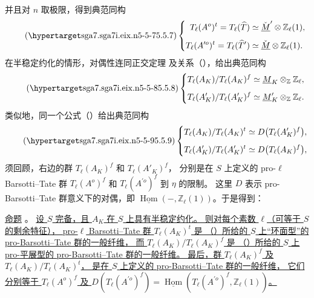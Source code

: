 并且对 $n$ 取极限，得到典范同构
\begin{equation}\tag{\SGARefTarget{sga7.sga7i.eix.n5-5-7}{5.5.7}}
 \left\{
 \begin{aligned}
  T_\ell(A^o)^t=T_\ell(\widehat T)
   &\simeq \check{\underline M}'\otimes\mathbb Z_\ell(1),\\[1ex]
  T_\ell(A^{\prime o})^t=T_\ell(\widehat T')
   &\simeq \check{\underline M}\otimes\mathbb Z_\ell(1).
 \end{aligned}
 \right.
\end{equation}
在半稳定约化的情形，对偶性连同正交定理 
及关系（），给出典范同构
\begin{equation}\tag{\SGARefTarget{sga7.sga7i.eix.n5-5-8}{5.5.8}}
 \left\{
 \begin{aligned}
  T_\ell(A_K)/T_\ell(A_K)^f
   &\simeq \underline M_K\otimes_{\mathbb Z}\mathbb Z_\ell,\\[1ex]
  T_\ell(A'_K)/T_\ell(A'_K)^f
   &\simeq \underline M'_K\otimes_{\mathbb Z}\mathbb Z_\ell.
 \end{aligned}
 \right.
\end{equation}
类似地，同一个公式（）给出典范同构
\begin{equation}\tag{\SGARefTarget{sga7.sga7i.eix.n5-5-9}{5.5.9}}
 \left\{
 \begin{aligned}
  T_\ell(A_K)/T_\ell(A_K)^t
   &\simeq D\bigl(T_\ell(A'_K)^f\bigr),\\[1ex]
  T_\ell(A'_K)/T_\ell(A'_K)^t
   &\simeq D\bigl(T_\ell(A_K)^f\bigr),
 \end{aligned}
 \right.
\end{equation}
须回顾，右边的群 $T_\ell(A_K)^f$ 和 $T_\ell(A'_K)^f$，
分别是在 $S$ 上定义的 pro-$\ell$ Barsotti--Tate 群 $T_\ell(A^o)^f$ 和
$T_\ell(A^{\prime o})^f$ 到 $\eta$ 的限制。
这里 $D$ 表示 pro-Barsotti--Tate 群意义下的对偶，即
$\underline{\operatorname{Hom}}(-,\mathbb Z_\ell(1))$。于是得到：

\medskip
\noindent
\underline{命题} 。
\underline{设 $S$ 完备，且 $A_K$ 在 $S$ 上具有半稳定约化。
则对每个素数 $\ell$（可等于 $S$ 的剩余特征），
pro-$\ell$ Barsotti--Tate 群 $T_\ell(A_K)^t$ 是
（）所给的 $S$ 上“环面型”的 pro-Barsotti--Tate 群的一般纤维，
而 $T_\ell(A_K)/T_\ell(A_K)^f$ 是
（）所给的 $S$ 上 pro-平展型的 pro-Barsotti--Tate 群的一般纤维。
最后，群 $T_\ell(A_K)^f$ 及 $T_\ell(A_K)/T_\ell(A_K)^t$，
是在 $S$ 上定义的 pro-Barsotti--Tate 群的一般纤维，
它们分别等于 $T_\ell(A^o)^f$ 及
$D(T_\ell(A^{\prime o})^f)=\underline{\operatorname{Hom}}(T_\ell(A^{\prime o})^f,\mathbb Z_\ell(1))$。}

